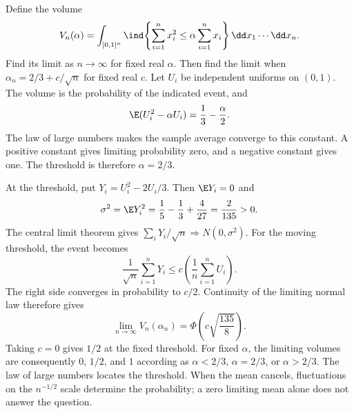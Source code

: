 Define the volume
\[
V_n(\alpha)=\int_{[0,1]^n}
\ind\!\left\{\sum_{i=1}^n x_i^2\le\alpha\sum_{i=1}^nx_i\right\}
\dd x_1\cdots\dd x_n.
\]
Find its limit as $n\to\infty$ for fixed real $\alpha$. Then find the limit when $\alpha_n=2/3+c/\sqrt n$ for fixed real $c$.
\solution Let $U_i$ be independent uniforms on $(0,1)$. The volume is the probability of the indicated event, and
\[
\E(U_i^2-\alpha U_i)=\frac13-\frac\alpha2.
\]
The law of large numbers makes the sample average converge to this constant. A positive constant gives limiting probability zero, and a negative constant gives one. The threshold is therefore $\alpha=2/3$.

At the threshold, put $Y_i=U_i^2-2U_i/3$. Then $\E Y_i=0$ and
\[
\sigma^2=\E Y_i^2
=\frac15-\frac13+\frac4{27}=\frac2{135}>0.
\]
The central limit theorem gives $\sum_iY_i/\sqrt n\Rightarrow N(0,\sigma^2)$. For the moving threshold, the event becomes
\[
\frac1{\sqrt n}\sum_{i=1}^nY_i
\le c\left(\frac1n\sum_{i=1}^nU_i\right).
\]
The right side converges in probability to $c/2$. Continuity of the limiting normal law therefore gives
\[
\boxed{\lim_{n\to\infty}V_n(\alpha_n)
=\Phi\!\left(c\sqrt{\frac{135}{8}}\right).}
\]
Taking $c=0$ gives $1/2$ at the fixed threshold. For fixed $\alpha$, the limiting volumes are consequently $0$, $1/2$, and $1$ according as $\alpha<2/3$, $\alpha=2/3$, or $\alpha>2/3$.
\insight The law of large numbers locates the threshold. When the mean cancels, fluctuations on the $n^{-1/2}$ scale determine the probability; a zero limiting mean alone does not answer the question.
